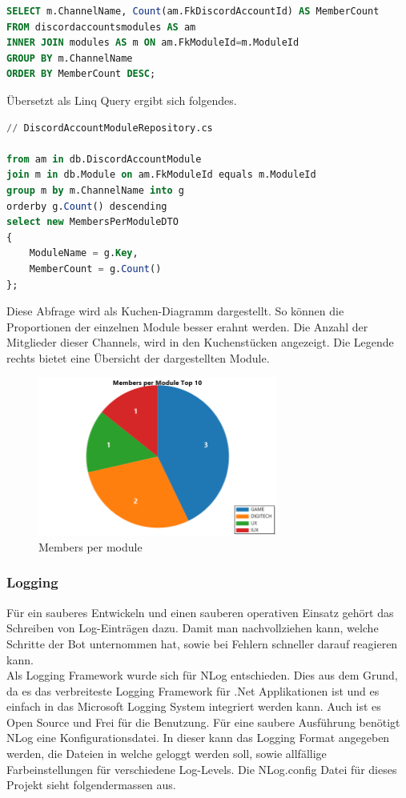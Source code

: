 \documentclass[a4paper, table]{article}
\begin{document}
\begin{lstlisting}[language=SQL]
SELECT m.ChannelName, Count(am.FkDiscordAccountId) AS MemberCount
FROM discordaccountsmodules AS am 
INNER JOIN modules AS m ON am.FkModuleId=m.ModuleId
GROUP BY m.ChannelName
ORDER BY MemberCount DESC;
\end{lstlisting}

Übersetzt als Linq Query ergibt sich folgendes.

\begin{lstlisting}[language=SQL]
// DiscordAccountModuleRepository.cs

from am in db.DiscordAccountModule
join m in db.Module on am.FkModuleId equals m.ModuleId
group m by m.ChannelName into g
orderby g.Count() descending
select new MembersPerModuleDTO
{
    ModuleName = g.Key,
    MemberCount = g.Count()
};
\end{lstlisting}

Diese Abfrage wird als Kuchen-Diagramm dargestellt. So können die Proportionen der einzelnen Module besser erahnt werden.
Die Anzahl der Mitglieder dieser Channels, wird in den Kuchenstücken angezeigt.
Die Legende rechts bietet eine Übersicht der dargestellten Module.

\begin{figure}[h]
    \centering
    \includegraphics[width=0.7\textwidth]{img/membersPerModule.png}
    \caption{Members per module}
    \label{fig:members-per-module}
\end{figure}
\clearpage

\subsubsection{Logging}
Für ein sauberes Entwickeln und einen sauberen operativen Einsatz gehört das Schreiben von Log-Einträgen dazu.
Damit man nachvollziehen kann, welche Schritte der Bot unternommen hat, sowie bei Fehlern schneller darauf reagieren kann.\\
Als Logging Framework wurde sich für NLog entschieden.\autocite{}
Dies aus dem Grund, da es das verbreiteste Logging Framework für .Net Applikationen ist und es einfach in das Microsoft Logging System integriert werden kann.
Auch ist es Open Source und Frei für die Benutzung.
Für eine saubere Ausführung benötigt NLog eine Konfigurationsdatei.
In dieser kann das Logging Format angegeben werden, die Dateien in welche geloggt werden soll, sowie allfällige Farbeinstellungen für verschiedene Log-Levels.
Die NLog.config Datei für dieses Projekt sieht folgendermassen aus.
\end{document}
